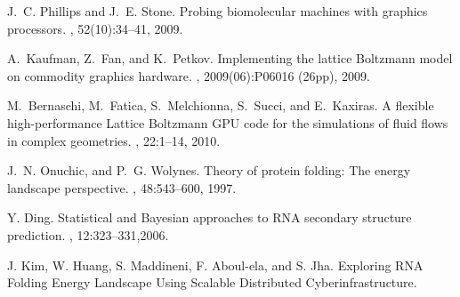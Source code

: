 \begin{thebibliography}{10}
J.~C. Phillips and J.~E. Stone.
\newblock Probing biomolecular machines with graphics processors.
, 52(10):34--41, 2009.

A.~Kaufman, Z.~Fan, and K.~Petkov.
\newblock Implementing the lattice {Boltzmann} model on commodity graphics
  hardware.
,
  2009(06):P06016 (26pp), 2009.

M.~Bernaschi, M.~Fatica, S.~Melchionna, S.~Succi, and E.~Kaxiras.
\newblock A flexible high-performance {Lattice Boltzmann GPU} code for the
  simulations of fluid flows in complex geometries.
, 22:1--14, 2010.

J.~N. Onuchic, and P.~G. Wolynes.
\newblock Theory of protein folding: The energy landscape perspective.
, 48:543--600, 1997.

Y. Ding.
\newblock Statistical and Bayesian approaches to RNA secondary structure prediction.
, 12:323--331,2006.

J. Kim, W. Huang, S. Maddineni, F. Aboul-ela, and S. Jha.
\newblock Exploring RNA Folding Energy Landscape Using Scalable Distributed Cyberinfrastructure.


\end{thebibliography}
